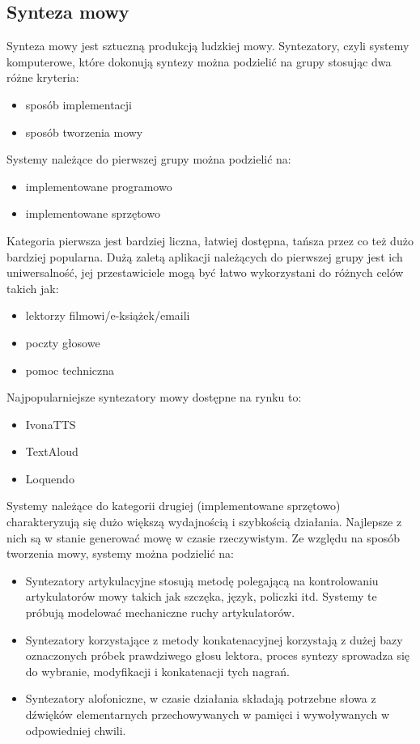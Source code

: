 \subsection{Synteza mowy}   
Synteza mowy jest sztuczną produkcją ludzkiej mowy. Syntezatory, czyli systemy komputerowe, które dokonują syntezy można podzielić na grupy stosując dwa różne kryteria:
\begin{itemize}
	\item sposób implementacji
	\item sposób tworzenia mowy
\end{itemize}
Systemy należące do pierwszej grupy można podzielić na:
\begin{itemize}
	\item implementowane programowo
	\item implementowane sprzętowo
\end{itemize}
Kategoria pierwsza jest bardziej liczna, łatwiej dostępna, tańsza przez co też dużo bardziej popularna. Dużą zaletą aplikacji należących do pierwszej grupy jest ich uniwersalność, jej przestawiciele  mogą być łatwo wykorzystani do różnych celów takich jak:
\begin{itemize}
	\item lektorzy filmowi/e-książek/emaili
	\item poczty głosowe
	\item pomoc techniczna
\end{itemize}
Najpopularniejsze syntezatory mowy dostępne na rynku to:
\begin{itemize}
	\item IvonaTTS
	\item TextAloud
	\item Loquendo
\end{itemize}
Systemy należące do kategorii drugiej (implementowane sprzętowo) charakteryzują się dużo większą wydajnością i szybkością działania. Najlepsze z nich są w stanie generować mowę w czasie rzeczywistym. 
Ze względu na sposób tworzenia mowy, systemy można podzielić na:
\begin{itemize}
	\item Syntezatory artykulacyjne stosują metodę polegającą na kontrolowaniu artykulatorów mowy takich jak szczęka, język, policzki itd. Systemy te próbują modelować mechaniczne ruchy artykulatorów.
	\item Syntezatory korzystające z metody konkatenacyjnej korzystają z dużej bazy oznaczonych próbek prawdziwego głosu lektora, proces syntezy sprowadza się do wybranie, modyfikacji i konkatenacji tych nagrań. 
	\item Syntezatory alofoniczne, w czasie działania składają potrzebne słowa z dźwięków elementarnych przechowywanych w pamięci i wywoływanych w odpowiedniej chwili. 
\end{itemize}
